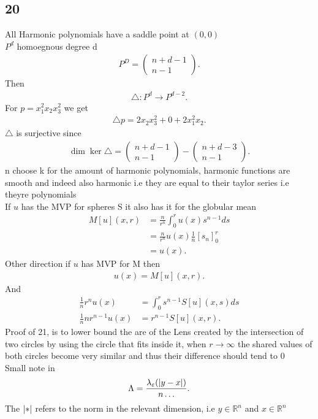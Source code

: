 \subsection*{20}
All Harmonic polynomials have a saddle point at $(0,0)$ \\[1ex]
$P^{d} $  homoegnous degree d 
\begin{align*}
  P^{D} = \begin{pmatrix} n+d-1 \\ n-1 \end{pmatrix}  
.\end{align*}
Then 
\begin{align*}
  \triangle : P^{d} \to P^{d-2}  
.\end{align*}
For $p = x_{1}^2x_{2}x_{3}^2$ we get
\begin{align*}
  \triangle p =  2x_{2}x_{3}^2  + 0 + 2x_{1}^2x_{2} 
.\end{align*}
$\triangle$ is surjective since 
\begin{align*}
 \dim \ker \triangle = \begin{pmatrix} n+d-1 \\ n-1 \end{pmatrix}   - \begin{pmatrix} n+d-3 \\ n-1 \end{pmatrix} 
.\end{align*}
n choose k for the amount of harmonic polynomials, harmonic functions are smooth and indeed also harmonic i.e 
they are equal to their taylor series i.e theyre polynomials\\
If $u$ has the MVP for spheres S it also has it for the globular mean 
\begin{align*}
  M[u](x,r)  &= \frac{n}{r^{n} } \int_0^{r} u(x)s^{n-1}   ds \\
             &= \frac{n}{r^{n} } u(x) \frac{1}{n} [s_n]_{0}^{r}  \\
             &= u(x)
.\end{align*}
Other direction if $u$ has MVP for M  then 
\begin{align*}
  u(x) = M[u](x,r)
.\end{align*}
And 
\begin{align*}
  \frac{1}{n}r^{n} u(x) &= \int_0^{r} s^{n-1}S[u](x,s)    ds \\
  \frac{1}{n}n r^{n-1}u(x)&= r^{n-1}S[u](x,r)  
.\end{align*}
Proof of 21, is to lower bound the are of the Lens created by the intersection of two circles by 
using the circle that fits inside it, when $r \to \infty$ the shared values of both circles become
very similar and thus their difference should tend to 0\\[1ex]
Small note in 
\begin{align*}
  \Lambda = \frac{\lambda_{\varepsilon }(\lvert y-x\rvert)}{n\ldots }
.\end{align*}
The $\lvert*\rvert$ refers to the norm in the relevant dimension, i.e $y \in  \mathbb{R}^{n} $ and $x \in  \mathbb{R}^{n} $

